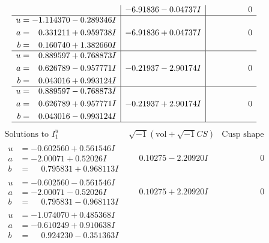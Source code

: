 \documentclass[1p]{elsarticle_modified}
\theoremstyle{definition}
\newcommand{\I}{\sqrt{-1}}
\begin{document}
$$\begin{array}{c|c|c}
 & -6.91836 - 0.04737 I & \phantom{-0.000000 } 0 \\ \hline\begin{aligned}
u &= -1.114370 - 0.289346 I \\
a &= \phantom{-}0.331211 + 0.959738 I \\
b &= \phantom{-}0.160740 + 1.382660 I\end{aligned}
 & -6.91836 + 0.04737 I & \phantom{-0.000000 } 0 \\ \hline\begin{aligned}
u &= \phantom{-}0.889597 + 0.768873 I \\
a &= \phantom{-}0.626789 - 0.957771 I \\
b &= \phantom{-}0.043016 + 0.993124 I\end{aligned}
 & -0.21937 - 2.90174 I & \phantom{-0.000000 } 0 \\ \hline\begin{aligned}
u &= \phantom{-}0.889597 - 0.768873 I \\
a &= \phantom{-}0.626789 + 0.957771 I \\
b &= \phantom{-}0.043016 - 0.993124 I\end{aligned}
 & -0.21937 + 2.90174 I & \phantom{-0.000000 } 0\\
 \hline 
 \end{array}$$\newpage$$\begin{array}{c|c|c}  
\text{Solutions to }I^u_{1}& \I (\text{vol} + \sqrt{-1}CS) & \text{Cusp shape}\\
 \hline 
\begin{aligned}
u &= -0.602560 + 0.561546 I \\
a &= -2.00071 + 0.52026 I \\
b &= \phantom{-}0.795831 + 0.968113 I\end{aligned}
 & \phantom{-}0.10275 - 2.20920 I & \phantom{-0.000000 } 0 \\ \hline\begin{aligned}
u &= -0.602560 - 0.561546 I \\
a &= -2.00071 - 0.52026 I \\
b &= \phantom{-}0.795831 - 0.968113 I\end{aligned}
 & \phantom{-}0.10275 + 2.20920 I & \phantom{-0.000000 } 0 \\ \hline\begin{aligned}
u &= -1.074070 + 0.485368 I \\
a &= -0.610249 + 0.910638 I \\
b &= \phantom{-}0.924230 - 0.351363 I\end{aligned}

\end{array}$$
\end{document}
